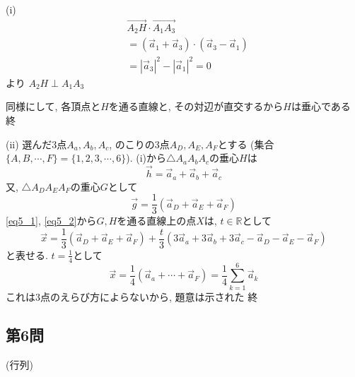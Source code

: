 \documentclass[../main.tex]{subfiles}
\begin{document}
(i)
\begin{align*}
  &\overrightarrow{A_2H} \cdot \overrightarrow{A_1A_3} \\
  &= (\vec{a}_1+\vec{a}_3) \cdot (\vec{a}_3-\vec{a}_1) \\
  &= |\vec{a}_3|^2 - |\vec{a}_1|^2 = 0
\end{align*}
より $A_2H \perp A_1A_3$

同様にして, 各頂点と$H$を通る直線と, その対辺が直交するから$H$は垂心である 終

(ii) 選んだ3点$A_a, A_b, A_c$, のこりの3点$A_D, A_E, A_F$とする
(集合$\{A, B, \cdots, F\} = \{1, 2, 3, \cdots, 6\}$). (i)から$\triangle A_aA_bA_c$の垂心$H$は
\begin{equation}
  \vec{h} = \vec{a}_a + \vec{a}_b + \vec{a}_c \label{eq5_1}
\end{equation}
又, $\triangle A_DA_EA_F$の重心$G$として
\begin{equation}
  \vec{g} = \frac{1}{3} (\vec{a}_D + \vec{a}_E + \vec{a}_F) \label{eq5_2}
\end{equation}
\eqref{eq5_1}, \eqref{eq5_2}から$G, H$を通る直線上の点$X$は, $t \in \mathbb{R}$として
\[
  \vec{x} = \frac{1}{3} (\vec{a}_D + \vec{a}_E + \vec{a}_F) + \frac{t}{3} (3\vec{a}_a + 3\vec{a}_b + 3\vec{a}_c - \vec{a}_D - \vec{a}_E - \vec{a}_F)
\]
と表せる. $t = \frac{1}{4}$として
\[
  \vec{x} = \frac{1}{4} (\vec{a}_a + \cdots + \vec{a}_F) = \frac{1}{4} \sum_{k=1}^6 \vec{a}_k
\]
これは3点のえらび方によらないから, 題意は示された 終

\subsection*{第6問}
(行列)
\end{document}
